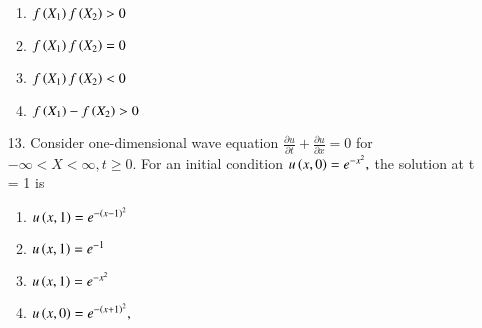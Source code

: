 \documentclass[journal]{IEEEtran}
\begin{document}
\begin{enumerate}
    \begin{enumerate}[label = (\Alph*)]
        \item $f\left(X_1\right)f\left(X_2\right)>0$
        \item $f\left(X_1\right)f\left(X_2\right)=0$
        \item $f\left(X_1\right)f\left(X_2\right)<0$
        \item $f\left(X_1\right)-f\left(X_2\right)>0$
    \end{enumerate}
    \item[13.] Consider one-dimensional wave equation $\frac{\partial u}{\partial t}+\frac{\partial u}{\partial x} = 0$ for $-\infty<X<\infty, t\geq 0$. For an initial condition $u\left(x,0\right)=e^{-x^2},$ the solution at t = 1 is 
    \begin{enumerate}[label = (\Alph*)]
        \item $u\left(x,1\right)=e^{-\left(x-1\right)^2}$
        \item $u\left(x,1\right)=e^{-1}$
        \item $u\left(x,1\right)=e^{-x^2}$
        \item $u\left(x,0\right)=e^{-\left(x+1\right)^2},$
    \end{enumerate} 
\end{enumerate}
\end{document}
